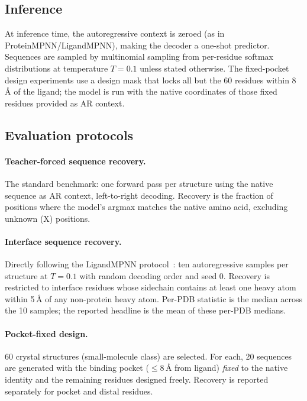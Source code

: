 \documentclass[11pt,letterpaper]{article}
\begin{document}
\subsection{Inference}
\label{sec:inference}

At inference time, the autoregressive context is zeroed (as in ProteinMPNN/LigandMPNN), making
the decoder a one-shot predictor. Sequences are sampled by multinomial sampling from per-residue
softmax distributions at temperature $T{=}0.1$ unless stated otherwise. The fixed-pocket design
experiments use a design mask that locks all but the 60 residues within 8\,{\AA} of the ligand;
the model is run with the native coordinates of those fixed residues provided as AR context.

\subsection{Evaluation protocols}
\label{sec:eval}

\paragraph{Teacher-forced sequence recovery.}
The standard benchmark: one forward pass per structure using the native sequence as AR context,
left-to-right decoding. Recovery is the fraction of positions where the model's argmax matches
the native amino acid, excluding unknown (X) positions.

\paragraph{Interface sequence recovery.}
Directly following the LigandMPNN protocol~\citep{dauparas2023atomic}: ten autoregressive samples
per structure at $T{=}0.1$ with random decoding order and seed 0. Recovery is restricted to
interface residues whose sidechain contains at least one heavy atom within 5\,{\AA} of any
non-protein heavy atom. Per-PDB statistic is the median across the 10 samples; the reported
headline is the mean of these per-PDB medians.

\paragraph{Pocket-fixed design.}
60 crystal structures (small-molecule class) are selected. For each, 20 sequences are generated
with the binding pocket ($\leq$8\,{\AA} from ligand) \emph{fixed} to the native identity and
the remaining residues designed freely. Recovery is reported separately for pocket and distal
residues.
\end{document}
